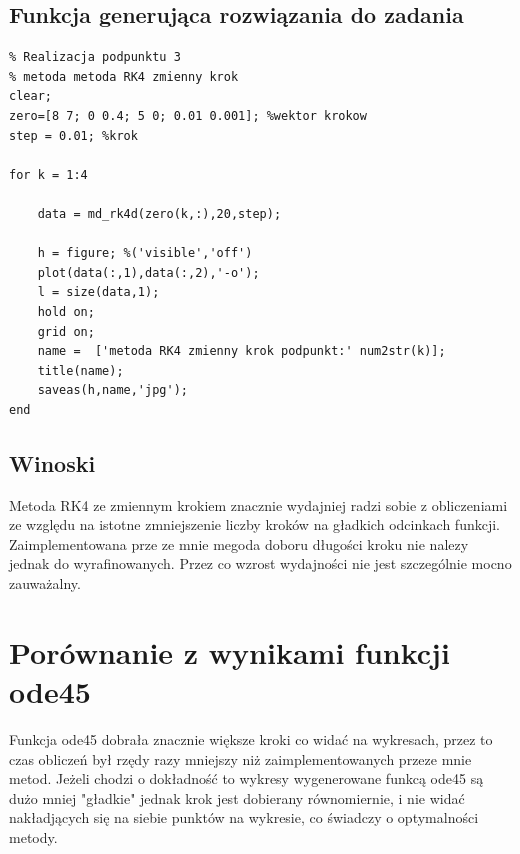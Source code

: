 \documentclass[a4paper, 12pt]{article}
\begin{document}
\subsection{Funkcja generująca rozwiązania do zadania}
\begin{lstlisting}
% Realizacja podpunktu 3 
% metoda metoda RK4 zmienny krok
clear; 
zero=[8 7; 0 0.4; 5 0; 0.01 0.001]; %wektor krokow
step = 0.01; %krok

for k = 1:4
    
    data = md_rk4d(zero(k,:),20,step);
    
    h = figure; %('visible','off')
    plot(data(:,1),data(:,2),'-o');
    l = size(data,1);
    hold on;
    grid on; 
    name =  ['metoda RK4 zmienny krok podpunkt:' num2str(k)];
    title(name);
    saveas(h,name,'jpg'); 
end
\end{lstlisting}
%

\subsection{Winoski}
Metoda RK4 ze zmiennym krokiem znacznie wydajniej radzi sobie z obliczeniami ze względu na istotne zmniejszenie liczby kroków na gładkich odcinkach funkcji. Zaimplementowana prze ze mnie megoda doboru długości kroku nie nalezy jednak do wyrafinowanych. Przez co wzrost wydajności nie jest szczególnie mocno zauważalny. 

\section{Porównanie z wynikami funkcji ode45}
Funkcja ode45 dobrała znacznie większe kroki co widać na wykresach, przez to czas obliczeń był rzędy razy mniejszy niż zaimplementowanych przeze mnie metod. Jeżeli chodzi o dokładność to wykresy wygenerowane funkcą ode45 są dużo mniej "gładkie" jednak krok jest dobierany równomiernie, i nie widać nakładjących się na siebie punktów na wykresie, co świadczy o optymalności metody. 
\end{document}
